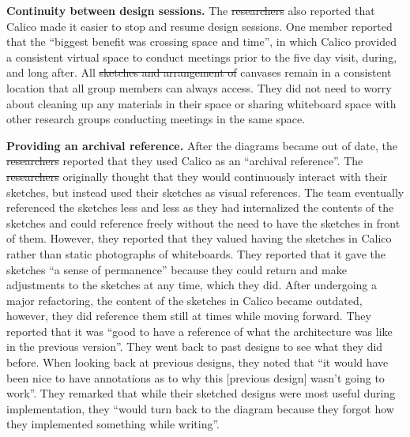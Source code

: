 \documentclass[12pt,fleqn]{ucithesis}
\providecommand{\DIFaddtex}[1]{{\protect\color{blue}\uwave{#1}}} %
\providecommand{\DIFdeltex}[1]{{\protect\color{red}\sout{#1}}}                      %
\providecommand{\DIFaddbegin}{} %
\providecommand{\DIFaddend}{} %
\providecommand{\DIFdelbegin}{} %
\providecommand{\DIFdelend}{} %
\providecommand{\DIFadd}[1]{\texorpdfstring{\DIFaddtex{#1}}{#1}} %
\providecommand{\DIFdel}[1]{\texorpdfstring{\DIFdeltex{#1}}{}} %
\begin{document}

\textbf{Continuity between design sessions.} The \DIFdelbegin \DIFdel{researchers }\DIFdelend \DIFaddbegin \DIFadd{research group }\DIFaddend also reported that Calico made it easier to stop and resume design sessions. One member reported that the ``biggest benefit was crossing space and time'', in which Calico provided a consistent virtual space to conduct meetings prior to the five day visit, during, and long after. All \DIFdelbegin \DIFdel{sketches and arrangement of }\DIFdelend canvases remain in a consistent location that all group members can always access. They did not need to worry about cleaning up any materials in their space or sharing whiteboard space with other research groups conducting meetings in the same space. 


\textbf{Providing an archival reference.} After the diagrams became out of date, the \DIFdelbegin \DIFdel{researchers }\DIFdelend \DIFaddbegin \DIFadd{research group }\DIFaddend reported that they used Calico as an ``archival reference''. The \DIFdelbegin \DIFdel{researchers }\DIFdelend \DIFaddbegin \DIFadd{research group }\DIFaddend originally thought that they would continuously interact with their sketches, but instead used their sketches as visual references. The team eventually referenced the sketches less and less as they had internalized the contents of the sketches and could reference freely without the need to have the sketches in front of them. However, they reported that they valued having the sketches in Calico rather than static photographs of whiteboards. They reported that it gave the sketches ``a sense of permanence'' because they could return and make adjustments to the sketches at any time, which they did. After undergoing a major refactoring, the content of the sketches in Calico became outdated, however, they did reference them still at times while moving forward. They reported that it was ``good to have a reference of what the architecture was like in the previous version''. They went back to past designs to see what they did before. When looking back at previous designs, they noted that ``it would have been nice to have annotations as to why this [previous design] wasn't going to work''. They remarked that while their sketched designs were most useful during implementation, they ``would turn back to the diagram because they forgot how they implemented something while writing''.
\end{document}
